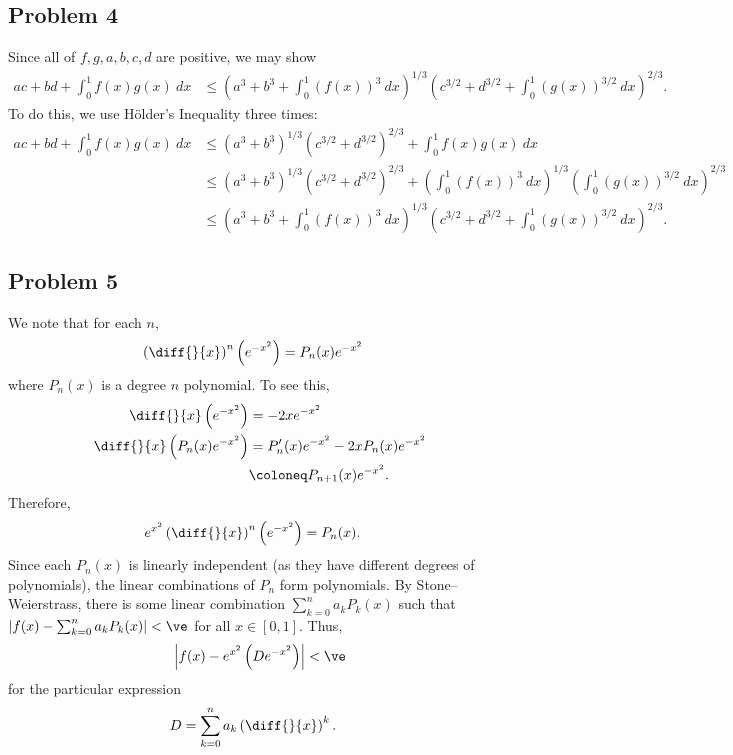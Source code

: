 \documentclass[10pt]{mypackage}
\begin{document}
\subsection{Problem 4}%
Since all of $f,g,a,b,c,d$ are positive, we may show
\begin{align*}
  ac + bd + \int_{0}^{1} f(x)g(x)\:dx &\leq \left( a^3 + b^3 + \int_{0}^{1} \left( f(x) \right)^3\:dx \right)^{1/3}\left( c^{3/2} + d^{3/2} + \int_{0}^{1} \left( g(x) \right)^{3/2}\:dx \right)^{2/3}.
\end{align*}
To do this, we use Hölder's Inequality three times:
\begin{align*}
  ac + bd + \int_{0}^{1} f(x)g(x)\:dx &\leq \left( a^3 + b^3 \right)^{1/3}\left( c^{3/2} + d^{3/2} \right)^{2/3} + \int_{0}^{1} f(x)g(x)\:dx\\
                                      &\leq \left( a^3 + b^3 \right)^{1/3}\left( c^{3/2} + d^{3/2} \right)^{2/3} + \left( \int_{0}^{1} \left( f(x) \right)^{3}\:dx \right)^{1/3}\left( \int_{0}^{1} \left( g(x) \right)^{3/2}\:dx \right)^{2/3}\\
                                      &\leq \left( a^3 + b^3 + \int_{0}^{1} \left( f(x) \right)^{3}\:dx \right)^{1/3}\left( c^{3/2} + d^{3/2} + \int_{0}^{1} \left( g(x) \right)^{3/2}\:dx \right)^{2/3}.
\end{align*}
\subsection{Problem 5}%
We note that for each $n$,
\begin{align*}
  \left( \diff{}{x} \right)^{n}\left( e^{-x^2} \right) &= P_n(x)e^{-x^2}
\end{align*}
where $P_n(x)$ is a degree $n$ polynomial. To see this,
\begin{align*}
  \diff{}{x}\left( e^{-x^2} \right) &= -2xe^{-x^2}\\
  \diff{}{x}\left( P_n(x)e^{-x^2} \right) &= P_n'(x)e^{-x^2} - 2xP_n(x)e^{-x^2}\\
                                          &\coloneq P_{n+1}(x)e^{-x^2}.
\end{align*}
Therefore,
\begin{align*}
  e^{x^2}\left( \diff{}{x} \right)^{n}\left( e^{-x^2} \right) &= P_n(x).
\end{align*}
Since each $P_n(x)$ is linearly independent (as they have different degrees of polynomials), the linear combinations of $P_n$ form polynomials. By Stone--Weierstrass, there is some linear combination $\sum_{k=0}^{n}a_kP_{k}(x)$ such that $\left\vert f(x)-\sum_{k=0}^{n}a_kP_k(x) \right\vert < \ve$ for all $x\in [0,1]$. Thus, 
\begin{align*}
  \left\vert f(x)-e^{x^2}\left( De^{-x^2} \right) \right\vert < \ve
\end{align*}
for the particular expression
\begin{align*}
  D &= \sum_{k=0}^{n}a_k\left( \diff{}{x} \right)^{k}.
\end{align*}
\end{document}
